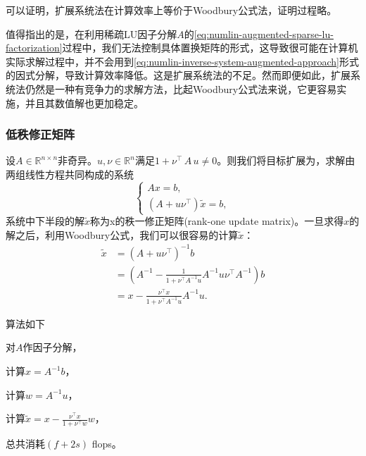 可以证明，扩展系统法在计算效率上等价于Woodbury公式法，证明过程略。

值得指出的是，在利用稀疏LU因子分解$A$的\eqref{eq:numlin-augmented-sparse-lu-factorization}过程中，我们无法控制具体置换矩阵的形式，这导致很可能在计算机实际求解过程中，并不会用到\eqref{eq:numlin-inverse-system-augmented-approach}形式的因式分解，导致计算效率降低。这是扩展系统法的不足。然而即便如此，扩展系统法仍然是一种有竞争力的求解方法，比起Woodbury公式法来说，它更容易实施，并且其数值解也更加稳定。

\subsubsection{低秩修正矩阵}
\label{sec:numlin-lower-rank-update}
设$A \in \mathbb{R}^{n \times n}$非奇异。$u,\nu \in \mathbb{R}^{n}$满足$1 + \nu^{\top} \, A \, u \neq 0$。则我们将目标扩展为，求解由两组线性方程共同构成的系统
\begin{equation}
  \label{eq:numlin-lower-rank-update}
  \begin{cases}
    A x = b, \\
    \left( A + u \nu^{\top} \right) \tilde{x} = b,
  \end{cases}
\end{equation}
系统中下半段的解$\tilde{x}$称为x的秩一修正矩阵(rank-one update matrix)。一旦求得$x$的解之后，利用Woodbury公式，我们可以很容易的计算$\tilde{x}$：
\begin{equation*}
  \begin{split}
    \tilde{x} & = \left( A + u \nu^{\top} \right)^{-1} b \\
    & = \left(
    A^{-1} - \frac{1}{1 + \nu^{\top} A^{-1} u} A^{-1} u \nu^{\top} A^{-1}
    \right) b \\
    & = x - \frac{\nu^{\top} x }{1 + \nu^{\top} A^{-1} u} A^{-1} u.
  \end{split}
\end{equation*}

算法如下
\begin{algorithm}[秩一修正的计算]
  \label{algorithm:numlin-lower-rank-update}
\item 对$A$作因子分解，
\item 计算$x = A^{-1} b$，
\item 计算$w = A^{-1} u$，
\item 计算$\tilde{x} = x - \frac{\nu^{\top} x }{1 + \nu^{\top} w} w$，
\item 总共消耗$ \left( f + 2s \right)$ flops。
\end{algorithm}

